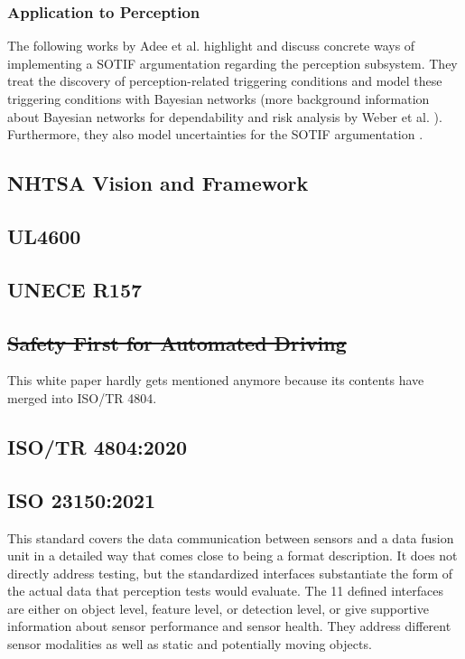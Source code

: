 \documentclass[conference]{IEEEtran}
\newcommand{\new}[1]{{\color{my-red}#1}}
\begin{document}
\subsubsection{\new{Application to Perception}}

The following works by Adee et al. highlight and discuss concrete ways of implementing a SOTIF argumentation regarding the perception subsystem. 
They treat the discovery of perception-related triggering conditions \cite{Adee2021discovery} and model these triggering conditions with Bayesian networks \cite{Adee2021bayesian} (more background information about Bayesian networks for dependability and risk analysis by Weber et al. \cite{Weber2012bayesiannetworks}).
Furthermore, they also model uncertainties for the SOTIF argumentation \cite{adee2020uncertainty}.

\subsection{NHTSA Vision and Framework}
\subsection{UL4600}
\subsection{UNECE R157}
\subsection{\new{\sout{Safety First for Automated Driving}}}
\label{sec:standards_safetyfirst}
This white paper hardly gets mentioned anymore because its contents have merged into ISO/TR 4804.

\subsection{ISO/TR 4804\new{:2020}}

\new{\subsection{ISO 23150:2021}}

This standard covers the data communication between sensors and a data fusion unit \cite{ISO_23150_2021_data_communication} in a detailed way that comes close to being a format description.
It does not directly address testing, but the standardized interfaces substantiate the form of the actual data that perception tests would evaluate. 
The 11 defined interfaces are either on object level, feature level, or detection level, or give supportive information about sensor performance and sensor health. 
They address different sensor modalities as well as static and potentially moving objects. 
\end{document}
